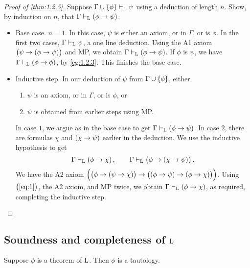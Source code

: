 \begin{proof}[Proof of \ref{thm:1.2.5}]
Suppose $ \Gamma \cup \cbr{\phi} \vdash_\L \psi $ using a deduction of length $ n $. Show, by induction on $ n $, that $ \Gamma \vdash_\L \impb{\phi}{\psi} $.
\begin{itemize}
\item Base case. $ n = 1 $. In this case, $ \psi $ is either an axiom, or in $ \Gamma $, or is $ \phi $. In the first two cases, $ \Gamma \vdash_{\mathrm{L}} \psi $, a one line deduction. Using the A1 axiom $ \impb{\psi}{\impb{\phi}{\psi}} $ and MP, we obtain $ \Gamma \vdash_\L \impb{\phi}{\psi} $. If $ \phi $ is $ \psi $, we have $ \Gamma \vdash_\L \impb{\phi}{\phi} $, by \ref{eg:1.2.3}. This finishes the base case.
\item Inductive step. In our deduction of $ \psi $ from $ \Gamma \cup \cbr{\phi} $, either
\begin{enumerate}[leftmargin=0.5in, label=Case \arabic*.]
\item $ \psi $ is an axiom, or in $ \Gamma $, or is $ \phi $, or
\item $ \psi $ is obtained from earlier steps using MP.
\end{enumerate}
In case $ 1 $, we argue as in the base case to get $ \Gamma \vdash_\L \impb{\phi}{\psi} $. In case $ 2 $, there are formulas $ \chi $ and $ \impb{\chi}{\psi} $ earlier in the deduction. We use the inductive hypothesis to get
\begin{equation}
\label{eq:1}
\Gamma \vdash_\L \impb{\phi}{\chi}, \qquad \Gamma \vdash_\L \impb{\phi}{\impb{\chi}{\psi}}.
\end{equation}
We have the A2 axiom $ \impb{\impb{\phi}{\impb{\psi}{\chi}}}{\impb{\impb{\phi}{\psi}}{\impb{\phi}{\chi}}} $. Using $ \br{\ref{eq:1}} $, the A2 axiom, and MP twice, we obtain $ \Gamma \vdash_\L \impb{\phi}{\chi} $, as required, completing the inductive step.
\end{itemize}
\end{proof}

\subsection{Soundness and completeness of \texorpdfstring{$ \L $}{L}}


\begin{theorem}[Soundness of $ \L $]
\label{thm:1.3.1}
Suppose $ \phi $ is a theorem of $ \L $. Then $ \phi $ is a tautology.
\end{theorem}

